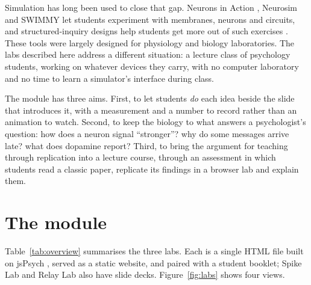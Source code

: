 \documentclass[11pt,a4paper]{article}
\begin{document}
Simulation has long been used to close that gap. Neurons in Action \citep{stuart2009}, Neurosim \citep{heitler2022} and SWIMMY \citep{grisham2008} let students experiment with membranes, neurons and circuits, and structured-inquiry designs help students get more out of such exercises \citep{crisp2012}. These tools were largely designed for physiology and biology laboratories. The labs described here address a different situation: a lecture class of psychology students, working on whatever devices they carry, with no computer laboratory and no time to learn a simulator's interface during class.

The module has three aims. First, to let students \emph{do} each idea beside the slide that introduces it, with a measurement and a number to record rather than an animation to watch. Second, to keep the biology to what answers a psychologist's question: how does a neuron signal ``stronger''? why do some messages arrive late? what does dopamine report? Third, to bring the argument for teaching through replication \citep{frank2012} into a lecture course, through an assessment in which students read a classic paper, replicate its findings in a browser lab and explain them.

\section{The module}

Table~\ref{tab:overview} summarises the three labs. Each is a single HTML file built on jsPsych \citep{deleeuw2015,deleeuw2023}, served as a static website, and paired with a student booklet; Spike Lab and Relay Lab also have slide decks. Figure~\ref{fig:labs} shows four views.
\end{document}
